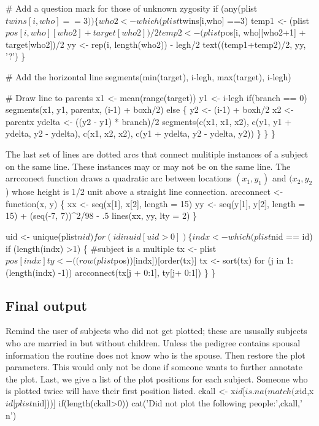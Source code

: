 \documentclass{article}
\begin{document}
        # Add a question mark for those of unknown zygosity
        if (any(plist$twins[i,who] ==3)) \{
          who2 <- which(plist$twins[i,who] ==3)
          temp1 <- (plist$pos[i, who][who2] + target[who2])/2
          temp2 <- (plist$pos[i, who][who2+1] + target[who2])/2
            yy <- rep(i, length(who2)) - legh/2
            text((temp1+temp2)/2, yy, '?')
            \}
        
        # Add the horizontal line 
        segments(min(target), i-legh, max(target), i-legh)

        # Draw line to parents
        x1 <- mean(range(target))
        y1 <- i-legh
        if(branch == 0)
            segments(x1, y1, parentx, (i-1) + boxh/2)
        else \{
            y2 <- (i-1) + boxh/2
            x2 <- parentx
            ydelta <- ((y2 - y1) * branch)/2
            segments(c(x1, x1, x2), c(y1, y1 + ydelta, y2 - ydelta), 
                     c(x1, x2, x2), c(y1 + ydelta, y2 - ydelta, y2))
            \}
        \}
    \}
\nwendcode{}\nwdocspar

The last set of lines are dotted arcs that connect mulitiple instances of
a subject on the same line.  These instances may or may not be on the
same line.
The arrcconect function draws a quadratic arc between locations $(x_1, y_1)$
and $(x_2, y_2$) whose height is 1/2 unit above a straight line connection.
\nwenddocs{}\plusendmoddef
arcconnect <- function(x, y) \{
    xx <- seq(x[1], x[2], length = 15)
    yy <- seq(y[1], y[2], length = 15) + (seq(-7, 7))^2/98 - .5
    lines(xx, yy, lty = 2)
    \}

uid <- unique(plist$nid)
for (id in uid[uid>0]) \{
    indx <- which(plist$nid == id)
    if (length(indx) >1) \{   #subject is a multiple
        tx <- plist$pos[indx]
        ty <- ((row(plist$pos))[indx])[order(tx)]
        tx <- sort(tx)
        for (j in 1:(length(indx) -1))
            arcconnect(tx[j + 0:1], ty[j+  0:1])
        \}
    \}
\nwendcode{}\nwdocspar

\subsection{Final output}
Remind the user of subjects who did not get
plotted; these are ususally subjects who are married in but without
children.  Unless the pedigree contains spousal information the
routine does not know who is the spouse.
Then restore the plot parameters.  This would only not be done if someone
wants to further annotate the plot.
Last, we give a list of the plot positions for each subject.  Someone
who is plotted twice will have their first position listed.
\nwenddocs{}\endmoddef
ckall <- x$id[is.na(match(x$id,x$id[plist$nid]))]
if(length(ckall>0)) cat('Did not plot the following people:',ckall,'\\n')
    
\end{document}
